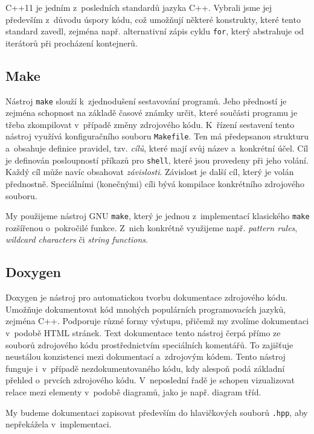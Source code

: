 \documentclass[thesis=B,czech,hidelinks]{thesis}[2012/06/26]
\begin{document}
C++11 je jedním z~posledních standardů jazyka C++. Vybrali jsme jej především z~důvodu úspory kódu, což umožňují některé konstrukty, které tento standard zavedl, zejména např. alternativní zápis cyklu \texttt{for}, který abstrahuje od iterátorů při procházení kontejnerů\cite{cpp}.

\subsection{Make}

Nástroj \texttt{make} slouží k~zjednodušení sestavování programů. Jeho předností je zejména schopnost na základě časové známky určit, které součásti programu je třeba zkompilovat v~případě změny zdrojového kódu. K~řízení sestavení tento nástroj využívá konfiguračního souboru \texttt{Makefile}. Ten má předepsanou strukturu a~obsahuje definice pravidel, tzv. \emph{cílů}, které mají svůj název a~konkrétní účel. Cíl je definován posloupností příkazů pro \texttt{shell}, které jsou provedeny při jeho volání. Každý cíl může navíc obsahovat \emph{závislosti}. Závislost je další cíl, který je volán přednostně. Speciálními (konečnými) cíli bývá kompilace konkrétního zdrojového souboru.

My použijeme nástroj GNU \texttt{make}, který je jednou z~implementací klasického \texttt{make} rozšířenou o~pokročilé funkce. Z~nich konkrétně využijeme např. \emph{pattern rules}, \emph{wildcard characters} či \emph{string functions}\cite{gmake}.

\subsection{Doxygen}

Doxygen je nástroj pro automatickou tvorbu dokumentace zdrojového kódu. Umožňuje dokumentovat kód mnohých populárních programovacích jazyků, zejména C++. Podporuje různé formy výstupu, přičemž my zvolíme dokumentaci v~podobě HTML stránek. Text dokumentace tento nástroj čerpá přímo ze souborů zdrojového kódu prostřednictvím speciálních komentářů. To zajišťuje neustálou konzistenci mezi dokumentací a~zdrojovým kódem. Tento nástroj funguje i~v~případě nezdokumentovaného kódu, kdy alespoň podá základní přehled o~prvcích zdrojového kódu. V~neposlední řadě je schopen vizualizovat relace mezi elementy v~podobě diagramů, jako je např. diagram tříd\cite{doxygen}.

My budeme dokumentaci zapisovat především do hlavičkových souborů \texttt{.hpp}, aby nepřekážela v~implementaci.
\end{document}

